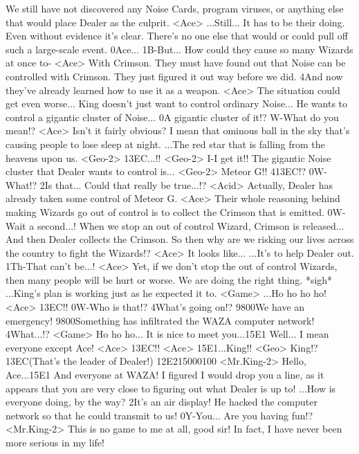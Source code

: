 We still have not discovered any Noise Cards, program viruses, or anything else 
that would place Dealer as the culprit. 
<Ace> ...Still... It has to be their doing. 
Even without evidence it's clear. 
There's no one else that would or could pull off such a large-scale event. 
0Ace... 
1B-But... 
How could they cause so many Wizards at once to- 
<Ace> With Crimson. 
They must have found out that Noise can be controlled with Crimson. 
They just figured it out way before we did. 
4And now they've already learned how to use it as a weapon. 
<Ace> The situation could get even worse... 
King doesn't just want to control ordinary Noise... 
He wants to control a gigantic cluster of Noise... 
0A gigantic cluster of it!? W-What do you mean!? 
<Ace> Isn't it fairly obvious? 
I mean that ominous ball in the sky that's causing people to lose sleep at night. 
...The red star that is falling from the heavens upon us. 
<Geo-2> {13}{EC}...!! 
<Geo-2> I-I get it!! 
The gigantic Noise cluster that Dealer wants to control is... 
<Geo-2> Meteor G!! 
4{13}{EC}!? 
0W-What!? 
2Is that... Could that really be true...!? 
<Acid> Actually, Dealer has already taken some control of Meteor G. 
<Ace> Their whole reasoning behind making Wizards go out of 
control is to collect the Crimson that is emitted. 
0W-Wait a second...! 
When we stop an out of control Wizard, Crimson is released... 
And then Dealer collects the Crimson. 
So then why are we risking our lives across the country to fight the Wizards!? 
<Ace> It looks like... 
...It's to help Dealer out. 
1Th-That can't be...! 
<Ace> Yet, if we don't stop the out of control Wizards, then 
many people will be hurt or worse. 
We are doing the right thing. 
*sigh* ...King's plan is working just as he expected it to. 
<Game> ...Ho ho ho ho! 
<Ace> {13}{EC}!! 
0W-Who is that!? 
4What's going on!? 
{98}{00}We have an emergency! 
{98}{00}Something has infiltrated the WAZA computer network! 
4What...!? 
<Game> Ho ho ho... 
It is nice to meet you...{15}{E1} Well... 
I mean everyone except Ace! 
<Ace> {13}{EC}!! 
<Ace> {15}{E1}...King!! 
<Geo> King!? 
{13}{EC}(That's the leader of Dealer!) 
{12}{E2}{15}{00}{01}{00} 
<Mr.King-2> Hello, Ace...{15}{E1} And everyone at WAZA! 
I figured I would drop you a line, as it appears that you 
are very close to figuring out what Dealer is up to! 
...How is everyone doing, by the way? 
2It's an air display! 
He hacked the computer network so that he could transmit to us! 
0Y-You... Are you having fun!? 
<Mr.King-2> This is no game to me at all, good sir! 
In fact, I have never been more serious in my life! 
